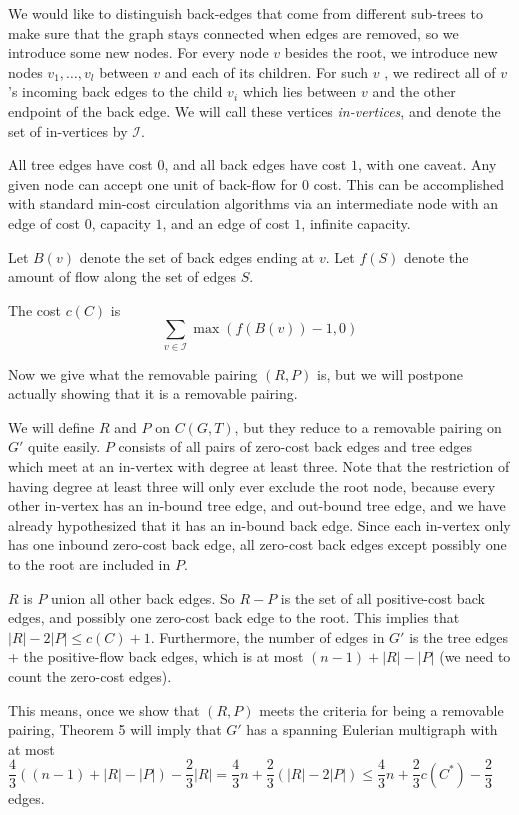 \documentclass[12pt]{article}
\begin{document}
We would like to distinguish back-edges that come from different sub-trees to
make sure that the graph stays connected when edges are removed, so we introduce
some new nodes.  For every node $v$ besides the root, we introduce new nodes
$v_1, \ldots, v_l$ between $v$ and each of its children.  For such $v$ , we
redirect all of $v$'s incoming back edges to the child $v_i$ which lies between
$v$ and the other endpoint of the back edge.  We will call these vertices
\emph{in-vertices}, and denote the set of in-vertices by $\mathcal{I}$.

All tree edges have cost $0$, and all back edges have cost $1$, with one
caveat.  Any given node can accept one unit of back-flow for $0$ cost.  This
can be accomplished with standard min-cost circulation algorithms via an
intermediate node with an edge of cost $0$, capacity $1$, and an edge of cost
$1$, infinite capacity.  

Let $B(v)$ denote the set of back edges ending at $v$.  Let $f(S)$ denote the
amount of flow along the set of edges $S$.

The cost $c(C)$ is
\[
\sum_{v \in \mathcal{I}} \max ( f(B(v)) - 1, 0)
\]

Now we give what the removable pairing $(R, P)$ is, but we will postpone
actually showing that it is a removable pairing.  

We will define $R$ and $P$ on $C(G, T)$, but they reduce to a removable pairing
on $G'$ quite easily.  $P$ consists of all pairs of zero-cost back edges and
tree edges which meet at an in-vertex with degree at least three.  Note that the
restriction of having degree at least three will only ever exclude the root
node, because every other in-vertex has an in-bound tree edge, and out-bound
tree edge, and we have already hypothesized that it has an in-bound back edge.
Since each in-vertex only has one inbound zero-cost back edge, all zero-cost
back edges except possibly one to the root are included in $P$.

$R$ is $P$ union all other back edges.  So $R - P$ is the set of all positive-cost back
edges, and possibly one zero-cost back edge to the root.  This implies that $|R|
- 2|P| \le c(C) + 1$.  Furthermore, the number of edges in $G'$ is the tree
  edges + the positive-flow back edges, which is at most $ (n - 1) + |R| - |P|$
(we need to count the zero-cost edges).

This means, once we show that $(R, P)$ meets the criteria for being a removable
pairing, Theorem 5 will imply that $G'$ has a spanning Eulerian multigraph
with at most $\dfrac{4}{3}((n-1) + |R| - |P|) - \dfrac{2}{3} |R| = \dfrac{4}{3}n
+ \dfrac{2}{3}(|R| - 2|P|) \le \dfrac{4}{3} n + \dfrac{2}{3} c(C^*) -
\dfrac{2}{3}$ edges. 
\end{document}
